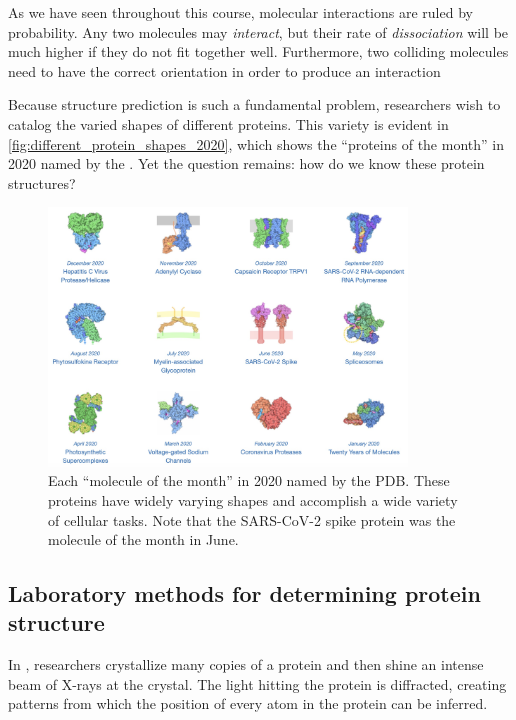 As we have seen throughout this course, molecular interactions are ruled by probability. Any two molecules may \textit{interact}, but their rate of \textit{dissociation} will be much higher if they do not fit together well. Furthermore, two colliding molecules need to have the correct orientation in order to produce an interaction

Because structure prediction is such a fundamental problem, researchers wish to catalog the varied shapes of different proteins. This variety is evident in \autoref{fig:different_protein_shapes_2020}, which shows the ``proteins of the month'' in 2020 named by the . Yet the question remains: how do we know these protein structures?

\begin{figure}[h]
	\centering
	\mySfFamily
	\includegraphics[width = 0.85\textwidth]{../images/different_protein_shapes_2020.jpg}
	\caption{Each ``molecule of the month'' in 2020 named by the PDB. These proteins have widely varying shapes and accomplish a wide variety of cellular tasks. Note that the SARS-CoV-2 spike protein was the molecule of the month in June.}
	\label{fig:different_protein_shapes_2020}
\end{figure}

\FloatBarrier
{}
\subsection{Laboratory methods for determining protein structure}

In , researchers crystallize many copies of a protein and then shine an intense beam of X-rays at the crystal. The light hitting the protein is diffracted, creating patterns from which the position of every atom in the protein can be inferred.

